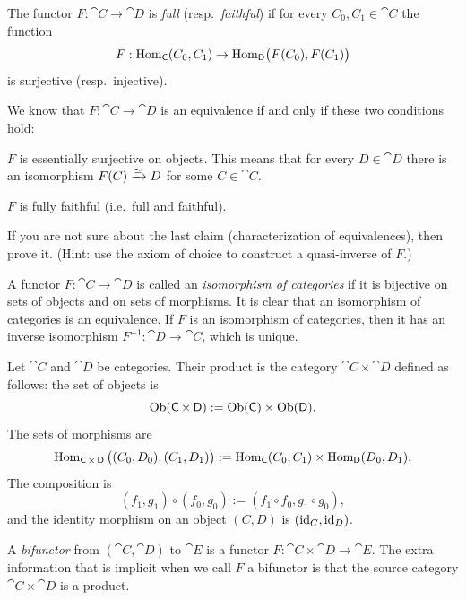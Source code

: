 The functor $F : \cat{C} \to \cat{D}$ is {\em full} (resp.\  {\em faithful})
if for every $C_0, C_1 \in \cat{C}$ the function 
\[ F : \operatorname{Hom}_{\operatorname{\mathsf{C}}}(C_0, C_1) \to 
\operatorname{Hom}_{\operatorname{\mathsf{D}}} \bigl( F(C_0), F(C_1) \bigr) \]
is surjective (resp.\ injective). 

We know that $F : \cat{C} \to \cat{D}$ is an equivalence if and only if these 
two conditions hold:
\begin{enumerate}
 $F$ is essentially surjective on objects. This means that for every
$D \in \cat{D}$  there is an isomorphism $F(C) \xrightarrow{\simeq} D$ for some $C \in \cat{C}$.

 $F$ is fully faithful (i.e.\ full and faithful). 
\end{enumerate}

\begin{exer}
If you are not sure about the last claim (characterization of equivalences), 
then prove it. (Hint: use the axiom of choice to construct a quasi-inverse of 
$F$.)  
\end{exer}

A functor $F : \cat{C} \to \cat{D}$ is called an {\em isomorphism of 
categories} if it is bijective on sets of objects and on sets of morphisms. It 
is clear that an isomorphism of categories is an equivalence. If $F$ is an 
isomorphism of categories, then it has an inverse isomorphism 
$F^{-1} : \cat{D} \to \cat{C}$, which is unique. 



 \label{subsec:bifunc}
Let $\cat{C}$ and $\cat{D}$ be categories. Their product is the category 
$\cat{C} \times \cat{D}$ defined as follows: the set of objects is 
\[ \operatorname{Ob}(\operatorname{\mathsf{C}} \times \operatorname{\mathsf{D}}) := 
\operatorname{Ob}(\operatorname{\mathsf{C}}) \times \operatorname{Ob}(\operatorname{\mathsf{D}}) . \] 
The sets of morphisms are 
\[ \operatorname{Hom}_{\operatorname{\mathsf{C}} \times \operatorname{\mathsf{D}}} \big( (C_0, D_0), (C_1, D_1) \big) :=
\operatorname{Hom}_{\operatorname{\mathsf{C}} } (C_0, C_1) \times 
\operatorname{Hom}_{\operatorname{\mathsf{D}} } (D_0, D_1)  . \]
The composition is 
\[ (f_1, g_1) \circ (f_0, g_0) := 
(f_1 \circ f_0, g_1 \circ g_0) , \]
and the identity morphism on an object $(C, D)$ is
$( \operatorname{id}_C,  \operatorname{id}_D)$. 

A {\em bifunctor} from $(\cat{C}, \cat{D})$ to $\cat{E}$ is a functor 
$F : \cat{C} \times \cat{D} \to \cat{E}$.
The extra information that is implicit when we call $F$ a bifunctor 
is that the source category $\cat{C} \times \cat{D}$ is a product. 


 \label{subsec:repfunc}

